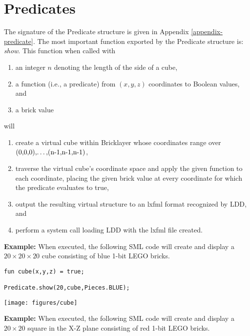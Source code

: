 \documentclass[submission,copyright,creativecommons]{eptcs}
\begin{document}
\section{Predicates}\label{section-predicates}


The signature of the Predicate structure is given in Appendix \ref{appendix-predicate}. The most important function exported by the Predicate structure is: \emph{show}. This function when called with

\begin{enumerate}
\item an integer $n$ denoting the length of the side of a cube,
\item a function (i.e., a predicate) from $(x,y,z)$ coordinates to Boolean values, and
\item a brick value
\end{enumerate}

\noindent will
\begin{enumerate}
\item create a virtual cube within Bricklayer whose coordinates range over $\mbox{(0,0,0),\dots,(n-1,n-1,n-1)}$,
\item traverse the virtual cube's coordinate space and apply the given function to each coordinate, placing the given brick value at every coordinate for which the predicate evaluates to true,
\item output the resulting virtual structure to an lxfml format recognized by LDD, and
\item perform a system call loading LDD with the lxfml file created.
\end{enumerate}



\textbf{Example:} When executed, the following SML code will create and display a $20\times20\times20$ cube consisting of blue 1-bit LEGO bricks.

\medskip
\begin{minipage}[b]{3in}
\begin{lstlisting}
fun cube(x,y,z) = true;

Predicate.show(20,cube,Pieces.BLUE);
\end{lstlisting}
\end{minipage}
\hspace*{5mm}
\begin{minipage}{2in}
\texttt{[image: figures/cube]}
\end{minipage}

\bigskip
\textbf{Example:} When executed, the following SML code will create and display a $20\times20$ square in the X-Z plane consisting of red 1-bit LEGO bricks.
\end{document}
